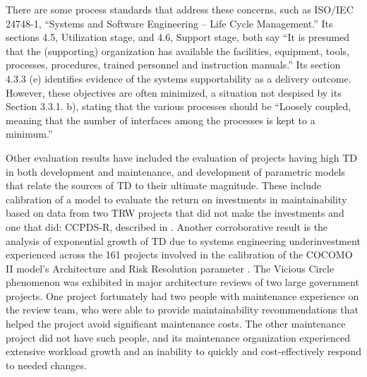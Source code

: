 There are some process standards that address these concerns, such as ISO/IEC 24748-1, “Systems and Software Engineering – Life Cycle Management.” Its sections 4.5, Utilization stage, and 4.6, Support stage, both say “It is presumed that the (supporting) organization has available the facilities, equipment, tools, processes, procedures, trained personnel and instruction manuals.” Its section 4.3.3 (e) identifies evidence of the systems supportability as a delivery outcome. However, these objectives are often minimized, a situation not despised by its Section 3.3.1. b), stating that the various processes should be “Loosely coupled, meaning that the number of interfaces among the processes is kept to a minimum.”
\cite{ISOICETR247481}


Other evaluation results have included the evaluation of projects 
having high TD in both development and maintenance, and development of parametric models that relate the sources of TD to their ultimate magnitude. These include calibration of a model to evaluate the return on investments in maintainability based on data from two TRW projects that did not make the investments and one that did: CCPDS-R, described in \cite{royce1998software}. Another corroborative result is the analysis of exponential growth of TD due to systems engineering underinvestment experienced across the 161 projects involved in the calibration of the COCOMO II model's Architecture and Risk Resolution parameter \cite{boehm2000software}. The Vicious Circle phenomenon was exhibited in major architecture reviews of two large government projects. One project fortunately had two people with maintenance experience on the review team, who were able to provide maintainability recommendations that helped the project avoid significant maintenance costs. The other maintenance project did not have such people, and its maintenance organization experienced extensive workload growth and an inability to quickly and cost-effectively respond to needed changes. 
